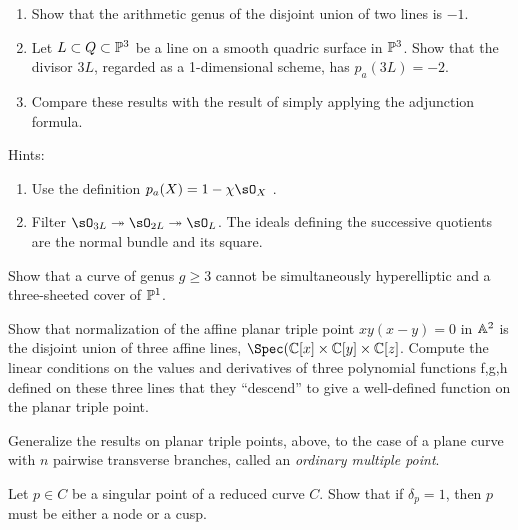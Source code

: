 \begin{exercise}\label{pa example}
\begin{enumerate}
 \item Show that the arithmetic genus of the disjoint union of two lines is $-1$.
\item Let $L\subset Q\subset \PP^3$ be a line on a smooth quadric surface in $\PP^3$. Show that the 
divisor $3L$, regarded as a 1-dimensional scheme, has $p_a(3L) = -2$.
\item Compare these results with the result of simply applying the adjunction formula.
\end{enumerate}
Hints:
\begin{enumerate}
 \item Use the definition $p_a(X) = 1-\chi \sO_X$ .
 \item Filter $\sO_{3L} \twoheadrightarrow \sO_{2L} \twoheadrightarrow \sO_L$. The ideals
 defining the successive quotients are the normal bundle and its square. 
\end{enumerate}
\end{exercise}

\begin{exercise}\label{gonality exclusion}
Show that a curve of genus $g \geq 3$ cannot be simultaneously hyperelliptic and a three-sheeted cover of $\PP^1$.
\end{exercise}

\begin{exercise}\label{planar triple pt}
Show that normalization of the affine planar triple point $xy(x-y) = 0$ in $\AA^2$ is the disjoint union of three
affine lines, $\Spec(\CC[x] \times \CC[y]\times \CC[z]$. Compute the linear conditions on the values and derivatives of three polynomial functions f,g,h defined on
these three lines that they ``descend'' to give a well-defined function on the planar triple point.
\end{exercise}

\begin{exercise} Generalize the results on planar triple points, above, to the case of a plane curve with $n$ pairwise
transverse branches, called an \emph{ordinary multiple point}.
\end{exercise}

\begin{exercise}\label{delta=1 characterization}
Let $p \in C$ be a singular point of a reduced curve $C$. Show that if $\delta_p = 1$, then $p$ must be either a node or a cusp.
\end{exercise}

